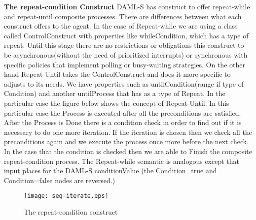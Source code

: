 \textbf{The repeat-condition Construct} DAML-S has construct to offer repeat-while and repeat-until composite processes. There are differences between what each construct offers to the agent. In the case of Repeat-while we are using a class called ControlConstruct with properties like whileCondition, which has a type of repeat. Until this stage there are no restrictions or obligations this construct to be asynchronous(without the need of prioritized interrupts) or synchronous with specific policies that implement polling or busy-waiting strategies. On the other hand Repeat-Until takes the ControlConstruct and does it more specific to adjusts to its needs. We have properties such as untilCondition(range if type of Condition) and another untilProcess that has as a type of Repeat. In the particular case the figure below shows the concept of Repeat-Until. In this particular case the Process is executed after all the preconditions are satisfied. After the Process is Done there is a condition check in order to find out if it is necessary to do one more iteration. If the iteration is chosen then we check all the preconditions again and we execute the process once more before the next check. In the case that the condition is checked then we are able to Finish the composite repeat-condition process. The Repeat-while semantic is analogous except that input places for the DAML-S conditionValue (the Condition=true and Condition=false nodes are reversed.)
\begin{figure}[h]
    \centering
    \texttt{[image: seq-iterate.eps]}
    \caption{The repeat-condition construct}
    \label{fig:Conditional effects and outputs}
\end{figure}